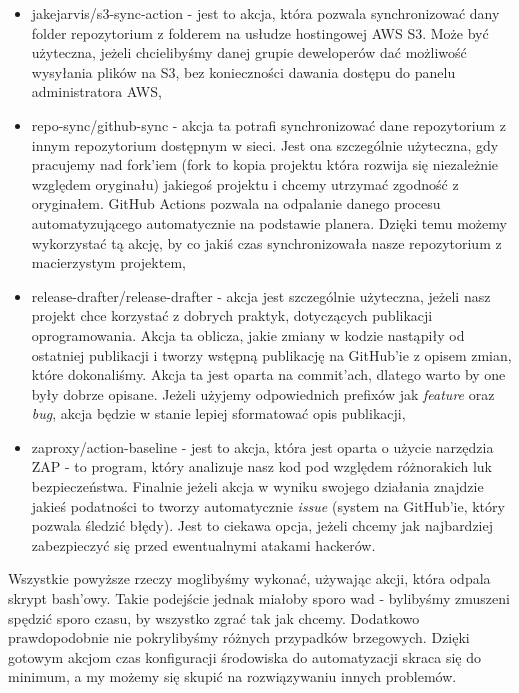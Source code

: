 \begin{itemize}
  \item jakejarvis/s3-sync-action - jest to akcja, która pozwala synchronizować dany folder repozytorium z folderem na usłudze hostingowej AWS S3. Może być użyteczna, jeżeli chcielibyśmy danej grupie deweloperów dać możliwość wysyłania plików na S3, bez konieczności dawania dostępu do panelu administratora AWS,
  \item repo-sync/github-sync - akcja ta potrafi synchronizować dane repozytorium z innym repozytorium dostępnym w sieci. Jest ona szczególnie użyteczna, gdy pracujemy nad fork'iem (fork to kopia projektu która rozwija się niezależnie względem oryginału) jakiegoś projektu i chcemy utrzymać zgodność z oryginałem. GitHub Actions pozwala na odpalanie danego procesu automatyzującego automatycznie na podstawie planera. Dzięki temu możemy wykorzystać tą akcję, by co jakiś czas synchronizowała nasze repozytorium z macierzystym projektem,
  \item release-drafter/release-drafter - akcja jest szczególnie użyteczna, jeżeli nasz projekt chce korzystać z dobrych praktyk, dotyczących publikacji oprogramowania. Akcja ta oblicza, jakie zmiany w kodzie nastąpiły od ostatniej publikacji i tworzy wstępną publikację na GitHub'ie z opisem zmian, które dokonaliśmy. Akcja ta jest oparta na commit'ach, dlatego warto by one były dobrze opisane. Jeżeli użyjemy odpowiednich prefixów jak \textit{feature} oraz \textit{bug}, akcja będzie w stanie lepiej sformatować opis publikacji,
  \item zaproxy/action-baseline - jest to akcja, która jest oparta o użycie narzędzia ZAP - to program, który analizuje nasz kod pod względem różnorakich luk bezpieczeństwa. Finalnie jeżeli akcja w wyniku swojego działania znajdzie jakieś podatności to tworzy automatycznie \textit{issue} (system na GitHub'ie, który pozwala śledzić błędy). Jest to ciekawa opcja, jeżeli chcemy jak najbardziej zabezpieczyć się przed ewentualnymi atakami hackerów.
\end{itemize}
Wszystkie powyższe rzeczy moglibyśmy wykonać, używając akcji, która odpala skrypt bash'owy. Takie podejście jednak miałoby sporo wad - bylibyśmy zmuszeni spędzić sporo czasu, by wszystko zgrać tak jak chcemy. Dodatkowo prawdopodobnie nie pokrylibyśmy różnych przypadków brzegowych. Dzięki gotowym akcjom czas konfiguracji środowiska do automatyzacji skraca się do minimum, a my możemy się skupić na rozwiązywaniu innych problemów.
